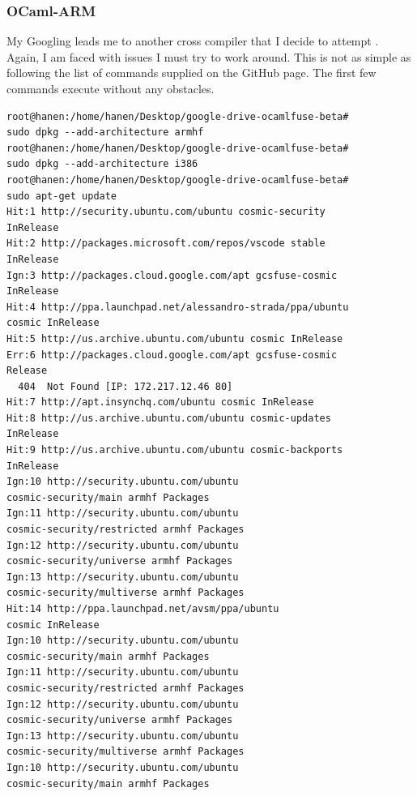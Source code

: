 \subsubsection{OCaml-ARM}
My Googling leads me to another cross compiler that I decide to attempt \cite{armcompiler}. Again, I am faced with issues I must try to work around. This is not as simple as following the list of commands supplied on the GitHub page. The first few commands execute without any obstacles.
\begin{verbatim}
root@hanen:/home/hanen/Desktop/google-drive-ocamlfuse-beta# 
sudo dpkg --add-architecture armhf
root@hanen:/home/hanen/Desktop/google-drive-ocamlfuse-beta# 
sudo dpkg --add-architecture i386
root@hanen:/home/hanen/Desktop/google-drive-ocamlfuse-beta# 
sudo apt-get update
Hit:1 http://security.ubuntu.com/ubuntu cosmic-security 
InRelease
Hit:2 http://packages.microsoft.com/repos/vscode stable 
InRelease                                          
Ign:3 http://packages.cloud.google.com/apt gcsfuse-cosmic 
InRelease                                        
Hit:4 http://ppa.launchpad.net/alessandro-strada/ppa/ubuntu 
cosmic InRelease                               
Hit:5 http://us.archive.ubuntu.com/ubuntu cosmic InRelease                                                 
Err:6 http://packages.cloud.google.com/apt gcsfuse-cosmic 
Release                                          
  404  Not Found [IP: 172.217.12.46 80]
Hit:7 http://apt.insynchq.com/ubuntu cosmic InRelease                                                      
Hit:8 http://us.archive.ubuntu.com/ubuntu cosmic-updates 
InRelease                                         
Hit:9 http://us.archive.ubuntu.com/ubuntu cosmic-backports 
InRelease                                       
Ign:10 http://security.ubuntu.com/ubuntu 
cosmic-security/main armhf Packages                               
Ign:11 http://security.ubuntu.com/ubuntu 
cosmic-security/restricted armhf Packages
Ign:12 http://security.ubuntu.com/ubuntu 
cosmic-security/universe armhf Packages
Ign:13 http://security.ubuntu.com/ubuntu 
cosmic-security/multiverse armhf Packages
Hit:14 http://ppa.launchpad.net/avsm/ppa/ubuntu 
cosmic InRelease         
Ign:10 http://security.ubuntu.com/ubuntu 
cosmic-security/main armhf Packages
Ign:11 http://security.ubuntu.com/ubuntu 
cosmic-security/restricted armhf Packages
Ign:12 http://security.ubuntu.com/ubuntu 
cosmic-security/universe armhf Packages
Ign:13 http://security.ubuntu.com/ubuntu 
cosmic-security/multiverse armhf Packages
Ign:10 http://security.ubuntu.com/ubuntu 
cosmic-security/main armhf Packages

\end{verbatim}
